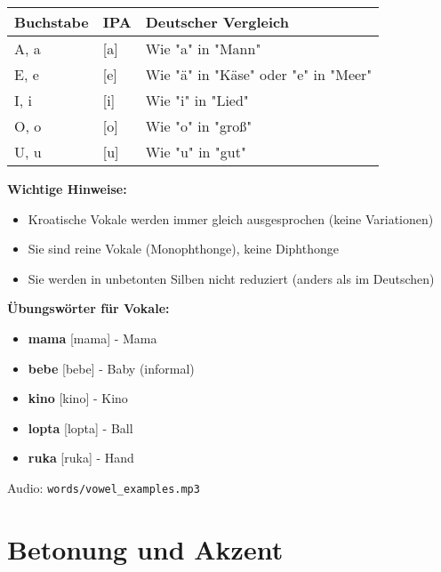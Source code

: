 \begin{tcolorbox}[colback=lightgreen!30, colframe=green!60!black, title=\textbf{Kroatische Vokale}]

\begin{center}
\begin{tabular}{lll}
\toprule
\textbf{Buchstabe} & \textbf{IPA} & \textbf{Deutscher Vergleich} \\
\midrule
A, a & [a] & Wie "a" in "Mann" \\
E, e & [e] & Wie "ä" in "Käse" oder "e" in "Meer" \\
I, i & [i] & Wie "i" in "Lied" \\
O, o & [o] & Wie "o" in "groß" \\
U, u & [u] & Wie "u" in "gut" \\
\bottomrule
\end{tabular}
\end{center}

\textbf{Wichtige Hinweise:}
\begin{itemize}
    \item Kroatische Vokale werden immer gleich ausgesprochen (keine Variationen)
    \item Sie sind reine Vokale (Monophthonge), keine Diphthonge
    \item Sie werden in unbetonten Silben nicht reduziert (anders als im Deutschen)
\end{itemize}

\textbf{Übungswörter für Vokale:}
\begin{itemize}
    \item \textbf{mama} [mama] - Mama
    \item \textbf{bebe} [bebe] - Baby (informal)
    \item \textbf{kino} [kino] - Kino
    \item \textbf{lopta} [lopta] - Ball
    \item \textbf{ruka} [ruka] - Hand
\end{itemize}

Audio: \texttt{words/vowel\_examples.mp3}

\end{tcolorbox}

\section{Betonung und Akzent}

